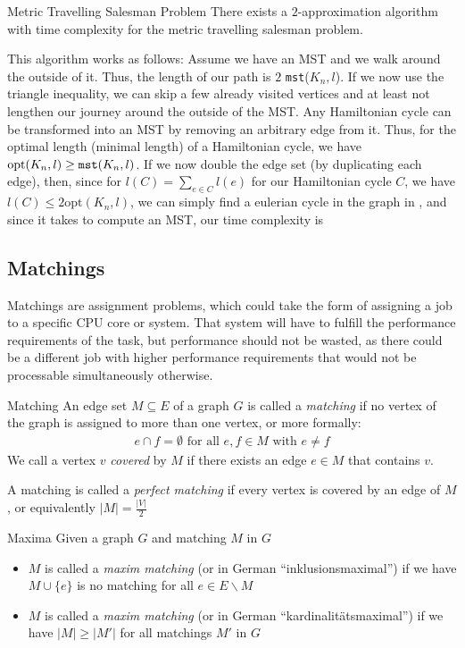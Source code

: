 \begin{theorem}[]{Metric Travelling Salesman Problem}
    There exists a $2$-approximation algorithm with time complexity  for the metric travelling salesman problem.
\end{theorem}

\shortproof This algorithm works as follows: Assume we have an MST and we walk around the outside of it. 
Thus, the length of our path is $2$ \verb|mst|($K_n, l$). 
If we now use the triangle inequality, we can skip a few already visited vertices and at least not lengthen our journey around the outside of the MST.
Any Hamiltonian cycle can be transformed into an MST by removing an arbitrary edge from it.
Thus, for the optimal length (minimal length) of a Hamiltonian cycle, we have $\text{opt}(K_n, l) \geq \verb|mst|(K_n, l)$. 
If we now double the edge set (by duplicating each edge), then, since for $l(C) = \sum_{e \in C} l(e)$ for our Hamiltonian cycle $C$, we have $l(C) \leq 2 \text{opt}(K_n, l)$, we can simply find a eulerian cycle in the graph in , and since it takes  to compute an MST, our time complexity is 


\newpage
\subsection{Matchings}
Matchings are assignment problems, which could take the form of assigning a job to a specific CPU core or system.
That system will have to fulfill the performance requirements of the task, but performance should not be wasted, as there could be a different job with higher performance requirements that would not be processable simultaneously otherwise.

\begin{definition}[]{Matching}
    An edge set $M \subseteq E$ of a graph $G$ is called a \textit{matching} if no vertex of the graph is assigned to more than one vertex, or more formally:
    \begin{align*}
        e \cap f = \emptyset \text{ for all } e, f \in M \text{ with } e \neq f
    \end{align*}
    We call a vertex $v$ \textit{covered} by $M$ if there exists an edge $e \in M$ that contains $v$.

    A matching is called a \textit{perfect matching} if every vertex is covered by an edge of $M$, or equivalently $|M| = \frac{|V|}{2}$
\end{definition}

\begin{definition}[]{Maxima}
    Given a graph $G$ and matching $M$ in $G$
    \begin{itemize}
        \item $M$ is called a \textit{maxim matching} (or in German ``inklusionsmaximal'') if we have $M \cup \{e\}$ is no matching for all $e \in E \backslash M$
        \item $M$ is called a \textit{maxim matching} (or in German ``kardinalitätsmaximal'') if we have $|M| \geq |M'|$ for all matchings $M'$ in $G$
    \end{itemize}
\end{definition}


